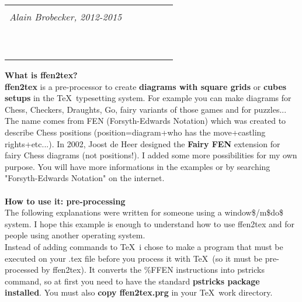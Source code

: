 \documentclass[10pt,a4paper]{article}
\begin{document}
\begin{center}
\begin{tabular}{lcr}
\scalebox{0.7}{
~~%
~~%
~~%
}
&
\begin{minipage}[b]{6cm}
\begin{center}
{\bf ffen2tex v0.9}\\
{\sl Alain Brobecker, 2012-2015}\\
~\\
\end{center}
\end{minipage}
&
~%
~%
~%
~%
\end{tabular}
\end{center}

\noindent
{\bf What is ffen2tex?}\\
{\bf ffen2tex} is a pre-processor to create {\bf diagrams with square grids} or {\bf cubes setups}
in the \TeX ~typesetting system. For example you can make diagrams for Chess, Checkers, Draughts,
Go, fairy variants of those games and for puzzles...\\
The name comes from FEN (Forsyth-Edwards Notation) which was created to describe Chess positions
(position=diagram+who has the move+castling rights+etc...). In 2002, Joost de Heer designed
the {\bf Fairy FEN}  extension for fairy Chess diagrams (not positions!).
I added some more possibilities for my own purpose.
You will have more informations in the examples or by searching "Forsyth-Edwards Notation" on the internet.\\
~\\


\noindent
{\bf How to use it: pre-processing}\\
The following explanations were written for someone using a window\$/m\$do\$ system.
I hope this example is enough to understand how to use ffen2tex and for people
using another operating system.\\

\noindent
Instead of adding commands to \TeX ~i chose to make a program that must be executed
on your .tex file before you process it with \TeX ~(so it must be pre-processed by
ffen2tex). It converts the \%{FFEN} instructions into pstricks command, so at first
you need to have the standard {\bf pstricks package installed}. You must also
{\bf copy ffen2tex.prg} in your \TeX ~work directory.\\
\end{document}
